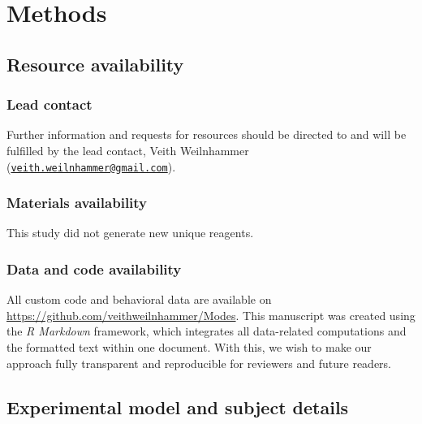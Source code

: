 \documentclass[
]{article}
\begin{document}
\newpage

\hypertarget{methods}{%
\section{Methods}\label{methods}}

\hypertarget{resource-availability}{%
\subsection{Resource availability}\label{resource-availability}}

\hypertarget{lead-contact}{%
\subsubsection{Lead contact}\label{lead-contact}}

Further information and requests for resources should be directed to and
will be fulfilled by the lead contact, Veith Weilnhammer
(\href{mailto:veith.weilnhammer@gmail.com}{\nolinkurl{veith.weilnhammer@gmail.com}}).

\hypertarget{materials-availability}{%
\subsubsection{Materials availability}\label{materials-availability}}

This study did not generate new unique reagents.

\hypertarget{data-and-code-availability}{%
\subsubsection{Data and code
availability}\label{data-and-code-availability}}

All custom code and behavioral data are available on
\url{https://github.com/veithweilnhammer/Modes}. This manuscript was
created using the \emph{R Markdown} framework, which integrates all
data-related computations and the formatted text within one document.
With this, we wish to make our approach fully transparent and
reproducible for reviewers and future readers.

\hypertarget{experimental-model-and-subject-details}{%
\subsection{Experimental model and subject
details}\label{experimental-model-and-subject-details}}
\end{document}
